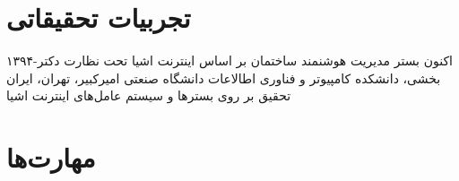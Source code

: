 \documentclass[]{friggeri-cv-fa} %
\begin{document}

\section{تجربیات تحقیقاتی}

\begin{entrylist}

\entry
{۱۳۹۴-اکنون}
{بستر مدیریت هوشنمند ساختمان بر اساس اینترنت اشیا}
{تحت نظارت دکتر بخشی، دانشکده کامپیوتر و فناوری اطالاعات دانشگاه صنعتی امیرکبیر، تهران، ایران}
{تحقیق بر روی بسترها و سیستم عامل‌های اینترنت اشیا}

\end{entrylist}


\section{مهارت‌ها}
\end{document}
